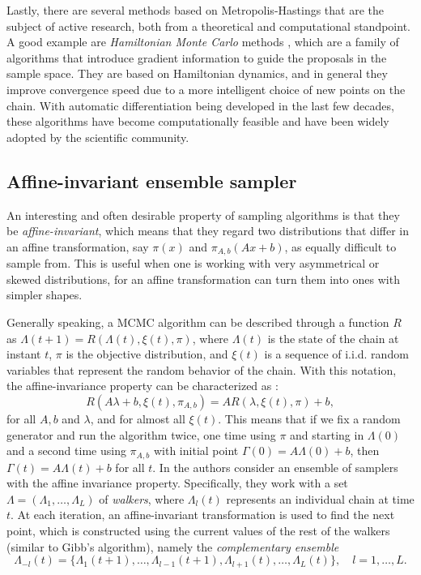 Lastly, there are several methods based on Metropolis-Hastings that are the subject of active research, both from a theoretical and computational standpoint. A good example are \textit{Hamiltonian Monte Carlo} methods \citep[e.g.][]{neal2011mcmc}, which are a family of algorithms that introduce gradient information to guide the proposals in the sample space. They are based on Hamiltonian dynamics, and in general they improve convergence speed due to a more intelligent choice of new points on the chain. With automatic differentiation being developed in the last few decades, these algorithms have become computationally feasible and have been widely adopted by the scientific community.

\subsection*{Affine-invariant ensemble sampler}

An interesting and often desirable property of sampling algorithms is that they be \textit{affine-invariant}, which means that they regard two distributions that differ in an affine transformation, say \(\pi(x)\) and \(\pi_{A, b}(Ax + b)\), as equally difficult to sample from. This is useful when one is working with very asymmetrical or skewed distributions, for an affine transformation can turn them into ones with simpler shapes.

Generally speaking, a MCMC algorithm can be described through a function \(R\) as \(\Lambda(t+1)=R(\Lambda(t), \xi(t), \pi)\), where \(\Lambda(t)\) is the state of the chain at instant \(t\), \(\pi\) is the objective distribution, and \(\xi(t)\) is a sequence of i.i.d. random variables that represent the random behavior of the chain. With this notation, the  affine-invariance property can be characterized as \citep{goodman2010ensemble}:
 \[
 R(A\lambda+b, \xi(t), \pi_{A,b}) = AR(\lambda, \xi(t), \pi) + b,
 \]
 for all \(A,b\) and \(\lambda\), and for almost all \(\xi(t)\). This means that if we fix a random generator and run the algorithm twice, one time using \(\pi\) and starting in \(\Lambda(0)\) and a second time using \(\pi_{A,b}\) with initial point \(\Gamma(0)=A\Lambda(0)+b\), then \(\Gamma(t)=A\Lambda(t)+b\) for all \(t\). In \citet{goodman2010ensemble} the authors consider an ensemble of samplers with the affine invariance property. Specifically, they work with a set \(\Lambda=(\Lambda_1, \dots, \Lambda_L)\) of \textit{walkers}, where \(\Lambda_l(t)\) represents an individual chain at time \(t\). At each iteration, an affine-invariant transformation is used to find the next point, which is constructed using the current values of the rest of the walkers (similar to Gibb's algorithm), namely the \textit{complementary ensemble}
 \[
  \Lambda_{-l}(t) = \{\Lambda_1(t+1), \dots, \Lambda_{l-1}(t+1), \Lambda_{l+1}(t), \dots, \Lambda_L(t)\}, \quad l=1,\dots, L.
  \]

